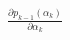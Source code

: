 \documentclass[preview]{standalone}
\begin{document}
\begin{align*}
\frac{\partial p_{k-1}(\alpha_k)}{\partial \alpha_k}
\end{align*}
\end{document}
